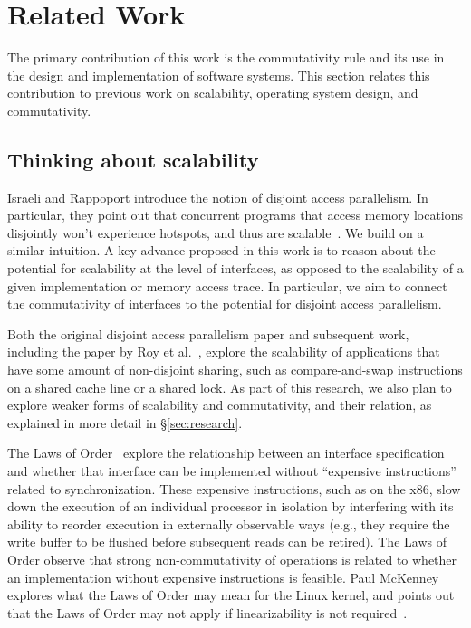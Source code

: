
\section{Related Work}
\label{sec:related}

The primary contribution of this work is the commutativity rule and its
use in the design and implementation of software systems.  This section
relates this contribution to previous work on scalability, operating
system design, and commutativity.

\subsection{Thinking about scalability}

Israeli and Rappoport introduce the notion of disjoint access parallelism.
In particular, they point out that concurrent programs that access
memory locations disjointly won't experience hotspots, and thus 
are scalable~\cite{israeli:disjoint-access}.  We build on a similar intuition.
A key advance proposed in this work is to reason about the potential
for scalability at the level of interfaces, as opposed to the
scalability of a given implementation or memory access trace.
In particular, we aim to connect the commutativity of interfaces to the
potential for disjoint access parallelism.

Both the original disjoint access parallelism paper and subsequent work,
including the paper by Roy et al.~\cite{roy:limits-dap}, explore
the scalability of applications that have some amount of non-disjoint
sharing, such as compare-and-swap instructions on a shared cache line
or a shared lock.  As part of this research, we also plan to explore
weaker forms of scalability and commutativity, and their relation,
as explained in more detail in \S\ref{sec:research}.

The Laws of Order~\cite{law:orders} explore the relationship between an
interface specification and whether that interface can be implemented
without ``expensive instructions'' related to synchronization.  These expensive
instructions, such
as  on the x86, slow down the execution of an individual
processor in isolation by interfering with its ability to reorder execution in
externally observable ways (e.g., they require the write buffer to be
flushed before subsequent reads can be retired).  The Laws of Order observe
that strong non-commutativity of operations is related to whether an
implementation without expensive instructions is feasible.  Paul
McKenney explores what the Laws of Order may mean for the Linux kernel,
and points out that the Laws of Order may not apply if linearizability
is not required~\cite{lwn:law}.


